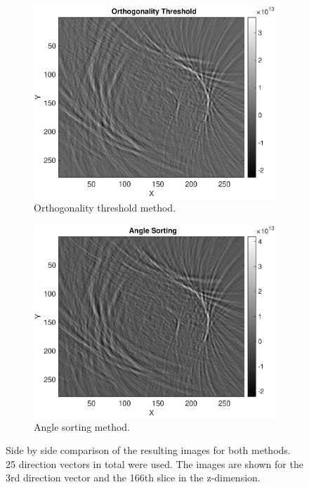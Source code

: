 \begin{figure}[H]
     \centering
     \begin{subfigure}[b]{0.49\textwidth}
         \centering
        \includegraphics[width=1.12\linewidth,right]{Graphics/Results/Diff_angle_sort_orthogonality/diff_ortho_bubble_slice_166_3_ortho.eps}
         \caption{Orthogonality threshold method.}
         \label{fig:res:slice_diff_bubble_ortho_image_ortho}
     \end{subfigure}
     \hfill
     \begin{subfigure}[b]{0.49\textwidth}
         \centering
         \includegraphics[width=1.12\textwidth,right]{Graphics/Results/Diff_angle_sort_orthogonality/diff_ortho_bubble_slice_166_3_sort.eps}
         \caption{Angle sorting method.}
         \label{fig:res:slice_diff_bubble_ortho_imagebubble}
     \end{subfigure}
        \caption{Side by side comparison of the resulting images for both methods. 25 direction vectors in total were used. The images are shown for the 3rd direction vector and the 166th slice in the z-dimension.}
        \label{fig:res:slice_diff_bubble_ortho_image}
\end{figure}

